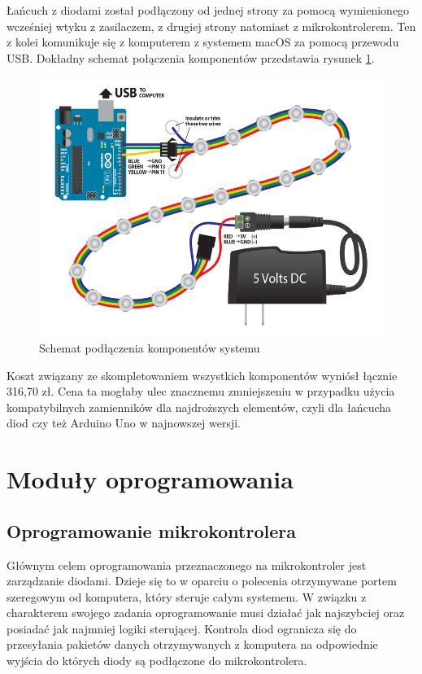 \documentclass[12pt]{report}
\begin{document}
Łańcuch z diodami został podłączony od jednej strony za pomocą wymienionego wcześniej wtyku z zasilaczem, z drugiej strony natomiast z mikrokontrolerem. Ten z kolei komunikuje się z komputerem z systemem macOS za pomocą przewodu USB. Dokładny schemat połączenia komponentów przedstawia rysunek \ref{schemat}.
	
\begin{figure}[h]
\centering
\includegraphics[width=\textwidth]{../resources/wiring.png}
\caption[Schemat podłączenia komponentów systemu]{Schemat podłączenia komponentów systemu \cite{schemat}}
\label{schemat}
\end{figure}
		
Koszt związany ze skompletowaniem wszystkich komponentów wyniósł łącznie 316,70 zł. Cena ta mogłaby ulec znacznemu zmniejszeniu w przypadku użycia kompatybilnych zamienników dla najdroższych elementów, czyli dla łańcucha diod czy też Arduino Uno w najnowszej wersji.


\section{Moduły oprogramowania}

\subsection{Oprogramowanie mikrokontrolera}

Głównym celem oprogramowania przeznaczonego na mikrokontroler jest zarządza\-nie diodami. Dzieje się to w oparciu o polecenia otrzymywane portem szeregowym od komputera, który steruje całym systemem. W związku z charakterem swojego zadania oprogramowanie musi działać jak najszybciej oraz posiadać jak najmniej logiki sterującej. Kontrola diod ogranicza się do przesyłania pakietów danych otrzymywanych z komputera na odpowiednie wyjścia do których diody są podłączone do mikrokontrolera. 
\end{document}

